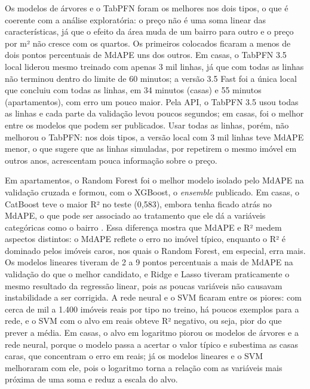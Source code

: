 \documentclass[
  article,
  a4paper,
  12pt,
  fleqn,
  oneside,
  chapter = TITLE,
  section = TITLE,
]{abntex2}
\begin{document}
Os modelos de árvores e o TabPFN foram os melhores nos dois tipos, o que é coerente com a análise exploratória: o preço não é uma soma linear das características, já que o efeito da área muda de um bairro para outro e o preço por m² não cresce com os quartos. Os primeiros colocados ficaram a menos de dois pontos percentuais de MdAPE uns dos outros. Em casas, o TabPFN 3.5 local liderou mesmo treinado com apenas 3 mil linhas, já que com todas as linhas não terminou dentro do limite de 60 minutos; a versão 3.5 Fast foi a única local que concluiu com todas as linhas, em 34 minutos (casas) e 55 minutos (apartamentos), com erro um pouco maior. Pela API, o TabPFN 3.5 usou todas as linhas e cada parte da validação levou poucos segundos; em casas, foi o melhor entre os modelos que podem ser publicados. Usar todas as linhas, porém, não melhorou o TabPFN: nos dois tipos, a versão local com 3 mil linhas teve MdAPE menor, o que sugere que as linhas simuladas, por repetirem o mesmo imóvel em outros anos, acrescentam pouca informação sobre o preço.

Em apartamentos, o Random Forest foi o melhor modelo isolado pelo MdAPE na validação cruzada e formou, com o XGBoost, o \textit{ensemble} publicado. Em casas, o CatBoost teve o maior R² no teste (0,583), embora tenha ficado atrás no MdAPE, o que pode ser associado ao tratamento que ele dá a variáveis categóricas como o bairro \cite{prokhorenkova2018}. Essa diferença mostra que MdAPE e R² medem aspectos distintos: o MdAPE reflete o erro no imóvel típico, enquanto o R² é dominado pelos imóveis caros, nos quais o Random Forest, em especial, erra mais. Os modelos lineares tiveram de 2 a 9 pontos percentuais a mais de MdAPE na validação do que o melhor candidato, e Ridge e Lasso tiveram praticamente o mesmo resultado da regressão linear, pois as poucas variáveis não causavam instabilidade a ser corrigida. A rede neural e o SVM ficaram entre os piores: com cerca de mil a 1.400 imóveis reais por tipo no treino, há poucos exemplos para a rede, e o SVM com o alvo em reais obteve R² negativo, ou seja, pior do que prever a média. Em casas, o alvo em logaritmo piorou os modelos de árvores e a rede neural, porque o modelo passa a acertar o valor típico e subestima as casas caras, que concentram o erro em reais; já os modelos lineares e o SVM melhoraram com ele, pois o logaritmo torna a relação com as variáveis mais próxima de uma soma e reduz a escala do alvo.
\end{document}
